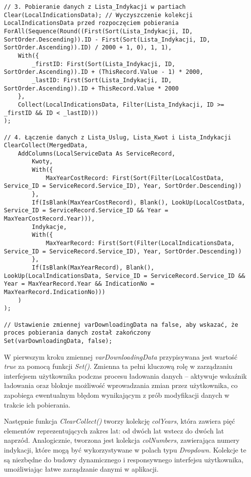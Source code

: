 \begin{lstlisting}[language=PowerFx]
// 3. Pobieranie danych z Lista_Indykacji w partiach
Clear(LocalIndicationsData); // Wyczyszczenie kolekcji LocalIndicationsData przed rozpoczęciem pobierania
ForAll(Sequence(Round((First(Sort(Lista_Indykacji, ID, SortOrder.Descending)).ID - First(Sort(Lista_Indykacji, ID, SortOrder.Ascending)).ID) / 2000 + 1, 0), 1, 1),
    With({
        _firstID: First(Sort(Lista_Indykacji, ID, SortOrder.Ascending)).ID + (ThisRecord.Value - 1) * 2000,
        _lastID: First(Sort(Lista_Indykacji, ID, SortOrder.Ascending)).ID + ThisRecord.Value * 2000
    },
    Collect(LocalIndicationsData, Filter(Lista_Indykacji, ID >= _firstID && ID < _lastID)))
);

// 4. Łączenie danych z Lista_Uslug, Lista_Kwot i Lista_Indykacji
ClearCollect(MergedData,
    AddColumns(LocalServiceData As ServiceRecord,
        Kwoty,
        With({
            MaxYearCostRecord: First(Sort(Filter(LocalCostData, Service_ID = ServiceRecord.Service_ID), Year, SortOrder.Descending))
        },
        If(IsBlank(MaxYearCostRecord), Blank(), LookUp(LocalCostData, Service_ID = ServiceRecord.Service_ID && Year = MaxYearCostRecord.Year))),
        Indykacje,
        With({
            MaxYearRecord: First(Sort(Filter(LocalIndicationsData, Service_ID = ServiceRecord.Service_ID), Year, SortOrder.Descending))
        },
        If(IsBlank(MaxYearRecord), Blank(), LookUp(LocalIndicationsData, Service_ID = ServiceRecord.Service_ID && Year = MaxYearRecord.Year && IndicationNo = MaxYearRecord.IndicationNo)))
    )
);

// Ustawienie zmiennej varDownloadingData na false, aby wskazać, że proces pobierania danych został zakończony
Set(varDownloadingData, false);
\end{lstlisting}

W pierwszym kroku zmiennej \emph{varDownloadingData} przypisywana jest wartość \emph{true} za pomocą funkcji \emph{Set()}. Zmienna ta pełni kluczową rolę w zarządzaniu interfejsem użytkownika podczas procesu ładowania danych – aktywuje wskaźnik ładowania oraz blokuje możliwość wprowadzania zmian przez użytkownika, co zapobiega ewentualnym błędom wynikającym z prób modyfikacji danych w trakcie ich pobierania.

Następnie funkcja \emph{ClearCollect()} tworzy kolekcję \emph{colYears}, która zawiera pięć elementów reprezentujących zakres lat: od dwóch lat wstecz do dwóch lat naprzód. Analogicznie, tworzona jest kolekcja \emph{colNumbers}, zawierająca numery indykacji, które mogą być wykorzystywane w polach typu \emph{Dropdown}. Kolekcje te są niezbędne do budowy dynamicznego i responsywnego interfejsu użytkownika, umożliwiając łatwe zarządzanie danymi w aplikacji.

